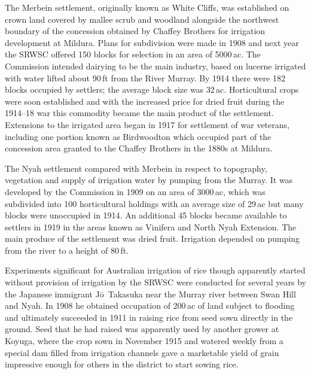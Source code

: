 The Merbein settlement, originally known as White Cliffs, was
established on crown land covered by mallee scrub and woodland
alongside the northwest boundary of the concession obtained by Chaffey
Brothers for irrigation development at Mildura.  Plans for subdivision
were made in 1908 and next year the SRWSC offered 150 blocks for
selection in an area of 5000\,ac.  The Commission intended dairying to
be the main industry, based on lucerne irrigated with water lifted
about 90\,ft from the River Murray.  By 1914 there were 182 blocks
occupied by settlers; the average block size was 32\,ac.
Horticultural crops were soon established and with the increased price
for dried fruit during the 1914--18 war this commodity became the main
product of the settlement.  Extensions to the irrigated area began in
1917 for settlement of war veterans, including one portion known as
Birdwoodton which occupied part of the concession area granted to the
Chaffey Brothers in the 1880s at Mildura.

The Nyah settlement compared with Merbein in respect to topography,
vegetation and supply of irrigation water by pumping from the Murray.
It was developed by the Commission in 1909 on an area of 3000\,ac,
which was subdivided into 100 horticultural holdings with an average
size of 29\,ac but many blocks were unoccupied in 1914. An additional
45 blocks became available to settlers in 1919 in the areas known as
Vinifera and North Nyah Extension.  The main produce of the settlement
was dried fruit.  Irrigation depended on pumping from the river to a
height of 80\,ft.

Experiments significant for Australian irrigation of rice though
apparently started without provision of irrigation by the SRWSC were
conducted for several years by the Japanese immigrant
J{\={o}}~Takasuka near the Murray river between Swan Hill and Nyah.
In 1908 he obtained occupation of 200\,ac of land subject to flooding
and ultimately succeeded in 1911 in raising rice from seed sown
directly in the ground.  Seed that he had raised was apparently used
by another grower at Koyuga, where the crop sown in November 1915 and
watered weekly from a special dam filled from irrigation channels gave
a marketable yield of grain impressive enough for others in the
district to start sowing rice.

